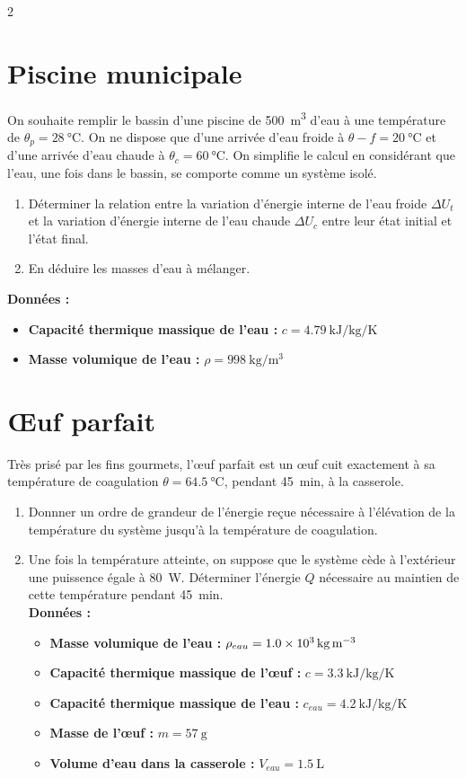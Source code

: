 \documentclass[a4paper,11pt,fleqn]{article}%
\begin{document}
\begin{multicols}{2}
\section{Piscine municipale}
On souhaite remplir le bassin d'une piscine de \SI{500}{\meter\cubed} d'eau à une température de $\theta_p = \SI{28}{\celsius}$. On ne dispose que d'une arrivée d'eau froide à $\theta-f = \SI{20}{\celsius}$ et d'une arrivée d'eau chaude à $\theta_c=\SI{60}{\celsius}$. On simplifie le calcul en considérant que l'eau, une fois dans le bassin, se comporte comme un système isolé.
\begin{enumerate}
	\item Déterminer la relation entre la variation d'énergie interne de l'eau froide $\Delta U_t$ et la variation d'énergie interne de l'eau chaude $\Delta U_c$ entre leur état initial et l'état final.
	\item En déduire les masses d'eau à mélanger.
\end{enumerate}
\textbf{Données :}
\begin{itemize}
	\item \textbf{Capacité thermique massique de l'eau :} $c = \SI{4,79}{\kilo\joule\per\kilo\gram\per\kelvin}$
	\item \textbf{Masse volumique de l'eau :} $\rho = \SI{998}{\kilo\gram\per\meter\cubed}$
\end{itemize}

\section{\OE uf parfait}
Très prisé par les fins gourmets, l'\oe uf parfait est un \oe uf cuit exactement à sa température de coagulation $\theta = \SI{64,5}{\celsius}$, pendant \SI{45}{\minute}, à la casserole.
\begin{enumerate}
	\item Donnner un ordre de grandeur de l'énergie reçue nécessaire à l'élévation de la température du système jusqu'à la température de coagulation.
	\item Une fois la température atteinte, on suppose que le système cède à l'extérieur une puissence égale à \SI{80}{\watt}. Déterminer l'énergie $Q$ nécessaire au maintien de cette température pendant \SI{45}{\minute}.\\
	\textbf{Données :}
	\begin{itemize}
		\item \textbf{Masse volumique de l'eau :} $\rho_{eau} = \SI{1,0E3}{\kilo\gram\per\meter\cubed}$
		\item \textbf{Capacité thermique massique de l'\oe uf :} $c=\SI{3,3}{\kilo\joule\per\kilo\gram\per\kelvin}$
		\item \textbf{Capacité thermique massique de l'eau :} $c_{eau} = \SI{4,2}{\kilo\joule\per\kilo\gram\per\kelvin}$
		\item \textbf{Masse de l'\oe uf :} $m = \SI{57}{\gram}$
		\item \textbf{Volume d'eau dans la casserole :} $V_{eau} = \SI{1,5}{\liter}$
	\end{itemize}
\end{enumerate}


\end{multicols}
\end{document}
